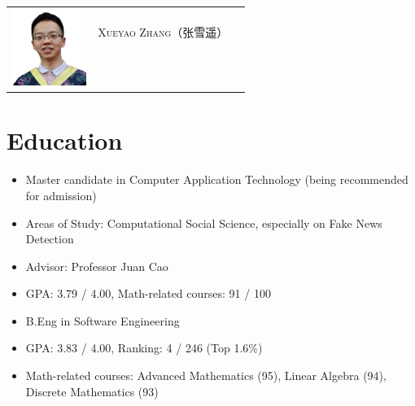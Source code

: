 \documentclass{resume}
\begin{document}

\Large{
  \begin{tabu}{ c l l }
    & \scshape{Xueyao Zhang（张雪遥）} &  \\
    &  &  \\
    &  &  \\
    & 
    &  
  \end{tabu}
}

\section{Education}
{
  \small 
\begin{itemize}
  \item Master candidate in Computer Application Technology (being recommended for admission)
  \item Areas of Study: Computational Social Science, especially on Fake News Detection
  \item Advisor: Professor Juan Cao
  \item GPA: 3.79 / 4.00, Math-related courses: 91 / 100
\end{itemize}
}

{
  \small 
\begin{itemize}
  \item B.Eng in Software Engineering
  \item GPA: 3.83 / 4.00, Ranking: 4 / 246 (Top 1.6\%)
  \item Math-related courses: Advanced Mathematics (95), Linear Algebra (94), Discrete Mathematics (93)
\end{itemize}
}
\end{document}
